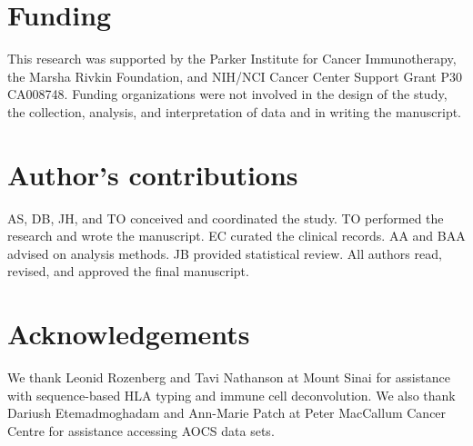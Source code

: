 \documentclass{bmcart}
\begin{document}
\begin{backmatter}
\section*{Funding}
This research was supported by the Parker Institute for Cancer Immunotherapy, the Marsha Rivkin Foundation, and NIH/NCI Cancer Center Support Grant P30 CA008748. Funding organizations were not involved in the design of the study, the collection, analysis, and interpretation of data and in writing the manuscript.

\section*{Author's contributions}
 AS, DB, JH, and TO conceived and coordinated the study. TO performed the research and wrote the manuscript. EC curated the clinical records. AA and BAA advised on analysis methods. JB provided statistical review.  All authors read, revised, and approved the final manuscript.

\section*{Acknowledgements}
We thank Leonid Rozenberg and Tavi Nathanson at Mount Sinai for assistance with sequence-based HLA typing and immune cell deconvolution. We also thank Dariush Etemadmoghadam and Ann-Marie Patch at Peter MacCallum Cancer Centre for assistance accessing AOCS data sets.




\end{backmatter}
\end{document}
